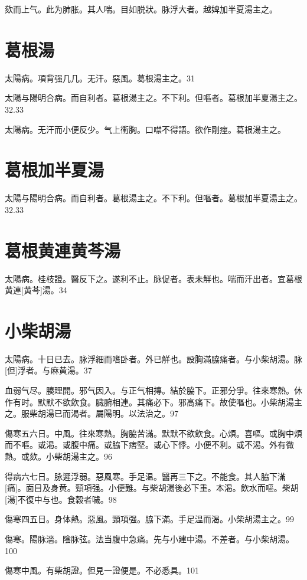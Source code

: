 \documentclass[12pt,oneside,UTF8,b5paper]{ctexbook}她她她她她她她
\begin{document}
欬而上气。此为肺胀。其人喘。目如脱狀。脉浮大者。越婢加半夏湯主之。

\section{葛根湯}

太陽病。項背强几几。无汗。惡風。葛根湯主之。31

太陽与陽明合病。而自利者。葛根湯主之。不下利。但嘔者。葛根加半夏湯主之。32.33

太陽病。无汗而小便反少。气上衝胸。口噤不得語。欲作剛痙。葛根湯主之。

\section{葛根加半夏湯}

太陽与陽明合病。而自利者。葛根湯主之。不下利。但嘔者。葛根加半夏湯主之。32.33

\section{葛根黄連黄芩湯}

太陽病。桂枝證。醫反下之。遂利不止。脉促者。表未觧也。喘而汗出者。宜葛根黄連[黄芩]湯。34

\section{小柴胡湯}

太陽病。十日已去。脉浮細而嗜卧者。外已觧也。設胸滿脇痛者。与小柴胡湯。脉[但]浮者。与麻黄湯。37

血弱气尽。腠理開。邪气因入。与正气相摶。結於脇下。正邪分爭。往來寒熱。休作有时。默默不欲飲食。臓腑相連。其痛必下。邪高痛下。故使嘔也。小柴胡湯主之。服柴胡湯已而渴者。屬陽明。以法治之。97

傷寒五六日。中風。往來寒熱。胸脇苦滿。默默不欲飲食。心煩。喜嘔。或胸中煩而不嘔。或渴。或腹中痛。或脇下痞堅。或心下悸。小便不利。或不渴。外有微熱。或欬。小柴胡湯主之。96

得病六七日。脉遲浮弱。惡風寒。手足温。醫再三下之。不能食。其人脇下滿[痛]。面目及身黄。頸項强。小便難。与柴胡湯後必下重。本渴。飲水而嘔。柴胡[湯]不復中与也。食穀者噦。98

傷寒四五日。身体熱。惡風。頸項强。脇下滿。手足温而渴。小柴胡湯主之。99

傷寒。陽脉濇。陰脉弦。法当腹中急痛。先与小建中湯。不差者。与小柴胡湯。100

傷寒中風。有柴胡證。但見一證便是。不必悉具。101
\end{document}
